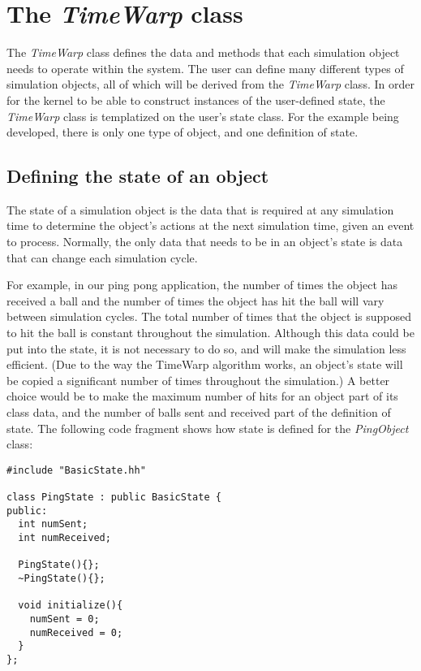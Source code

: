\documentclass[11pt]{report}
\begin{document}
\section{The {\it TimeWarp} class}

The {\it TimeWarp} class defines the data and methods that each
simulation object needs to operate within the system.  The user can
define many different types of simulation objects, all of which will be
derived from the {\it TimeWarp} class.  In order for the kernel to be
able to construct instances of the user-defined state, the
{\it TimeWarp} class is templatized on the user's state class.  For the
example being developed, there is only one type of object, and one
definition of state.

\subsection{Defining the state of an object}

The state of a simulation object is the data that is required at any
simulation time to determine the object's actions at the next simulation
time, given an event to process.  Normally, the only data that needs to
be in an object's state is data that can change each simulation cycle.

For example, in our ping pong application, the number of times the
object has received a ball and the number of times the object has
hit the ball will vary between simulation cycles.  The total number
of times that the object is supposed to hit the ball is constant
throughout the simulation.  Although this data could be put into the
state, it is not necessary to do so, and will make the simulation less
efficient.  (Due to the way the TimeWarp algorithm works, an object's
state will be copied a significant number of times throughout the
simulation.)  A better choice would be to make the maximum number of
hits for an object part of its class data, and the number of balls
sent and received part of the definition of state.  The following code
fragment shows how state is defined for the {\it PingObject} class:

\begin{verbatim}
#include "BasicState.hh"

class PingState : public BasicState {
public:
  int numSent;
  int numReceived;

  PingState(){};
  ~PingState(){};

  void initialize(){
    numSent = 0;
    numReceived = 0;
  }
};

\end{verbatim}
\end{document}
